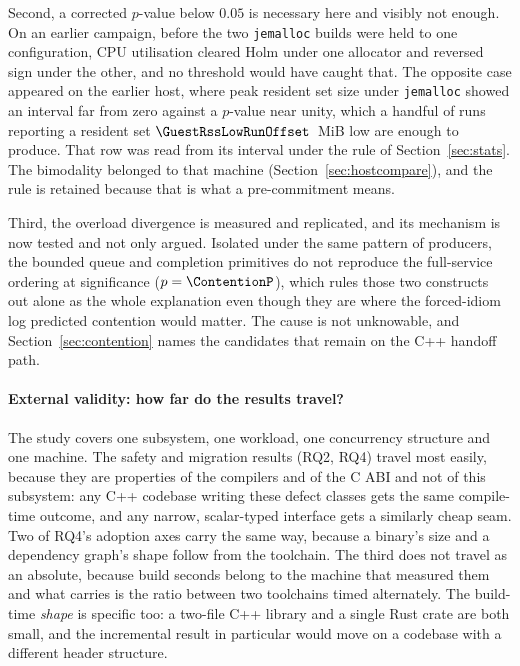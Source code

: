 Second, a corrected $p$-value below $0.05$ is necessary here and visibly not enough. On an earlier
campaign, before the two \texttt{jemalloc} builds were held to one configuration, CPU utilisation
cleared Holm under one allocator and reversed sign under the other, and no threshold would have
caught that. The opposite case appeared on the earlier host, where peak resident set size under
\texttt{jemalloc} showed an interval far from zero against a $p$-value near unity, which a handful
of runs reporting a resident set $\GuestRssLowRunOffset$~MiB low are enough to produce. That row
was read from its interval under the rule of Section~\ref{sec:stats}. The bimodality belonged to
that machine (Section~\ref{sec:hostcompare}), and the rule is retained because that is what a
pre-commitment means.

Third, the overload divergence is measured and replicated, and its mechanism is now tested and not
only argued. Isolated under the same pattern of \ContentionProducers{} producers, the bounded
queue and completion primitives do not reproduce the full-service ordering at significance
($p = \ContentionP$), which rules those two constructs out alone as the whole explanation even
though they are where the forced-idiom log predicted contention would matter. The cause is not
unknowable, and Section~\ref{sec:contention} names the candidates that remain on the C++ handoff
path.

\paragraph{External validity: how far do the results travel?}
The study covers one subsystem, one workload, one concurrency structure and one machine. The
safety and migration results (RQ2, RQ4) travel most easily, because they are properties of the
compilers and of the C ABI and not of this subsystem: any C++ codebase writing these defect
classes gets the same compile-time outcome, and any narrow, scalar-typed interface gets a
similarly cheap seam. Two of RQ4's adoption axes carry the same way, because a binary's size and a
dependency graph's shape follow from the toolchain. The third does not travel as an absolute,
because build seconds belong to the machine that measured them and what carries is the ratio
between two toolchains timed alternately. The build-time \emph{shape} is specific too: a two-file
C++ library and a single Rust crate are both small, and the incremental result in particular would
move on a codebase with a different header structure.

